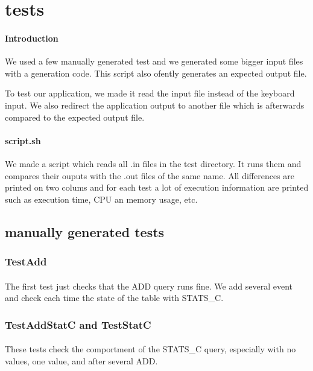 \section{tests}

\paragraph{Introduction}
We used a few manually generated test and we generated some bigger input files with a generation code.
This script also ofently generates an expected output file.

To test our application, we made it read the input file instead of the keyboard input. We also redirect the application output to another file which is afterwards compared to the expected output file.

\paragraph{script.sh}
We made a script which reads all .in files in the test directory. It runs them and compares their ouputs with the .out files of the same name.
All differences are printed on two colums and for each test a lot of execution information are printed such as execution time, CPU an memory usage, etc.


\subsection{manually generated tests}

\subsubsection{TestAdd}
\paragraph{}
The first test just checks that the ADD query runs fine. We add several event and check each time the state of the table with STATS\_C.

\subsubsection{TestAddStatC and TestStatC}
\paragraph{}
These tests check the comportment of the STATS\_C query, especially with no values, one value, and after several ADD.


